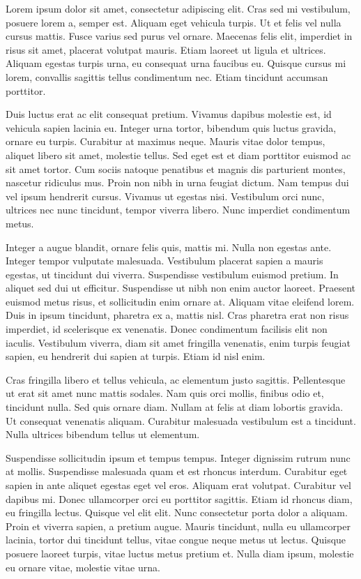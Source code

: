 \documentclass[11pt]{hmcpset}
\begin{document}
\begin{problem}
Lorem ipsum dolor sit amet, consectetur adipiscing elit. Cras sed mi vestibulum, posuere lorem a, semper est. Aliquam eget vehicula turpis. Ut et felis vel nulla cursus mattis. Fusce varius sed purus vel ornare. Maecenas felis elit, imperdiet in risus sit amet, placerat volutpat mauris. Etiam laoreet ut ligula et ultrices. Aliquam egestas turpis urna, eu consequat urna faucibus eu. Quisque cursus mi lorem, convallis sagittis tellus condimentum nec. Etiam tincidunt accumsan porttitor.

Duis luctus erat ac elit consequat pretium. Vivamus dapibus molestie est, id vehicula sapien lacinia eu. Integer urna tortor, bibendum quis luctus gravida, ornare eu turpis. Curabitur at maximus neque. Mauris vitae dolor tempus, aliquet libero sit amet, molestie tellus. Sed eget est et diam porttitor euismod ac sit amet tortor. Cum sociis natoque penatibus et magnis dis parturient montes, nascetur ridiculus mus. Proin non nibh in urna feugiat dictum. Nam tempus dui vel ipsum hendrerit cursus. Vivamus ut egestas nisi. Vestibulum orci nunc, ultrices nec nunc tincidunt, tempor viverra libero. Nunc imperdiet condimentum metus.
\end{problem}
\begin{solution}
	Integer a augue blandit, ornare felis quis, mattis mi. Nulla non egestas ante. Integer tempor vulputate malesuada. Vestibulum placerat sapien a mauris egestas, ut tincidunt dui viverra. Suspendisse vestibulum euismod pretium. In aliquet sed dui ut efficitur. Suspendisse ut nibh non enim auctor laoreet. Praesent euismod metus risus, et sollicitudin enim ornare at. Aliquam vitae eleifend lorem. Duis in ipsum tincidunt, pharetra ex a, mattis nisl. Cras pharetra erat non risus imperdiet, id scelerisque ex venenatis. Donec condimentum facilisis elit non iaculis. Vestibulum viverra, diam sit amet fringilla venenatis, enim turpis feugiat sapien, eu hendrerit dui sapien at turpis. Etiam id nisl enim.

Cras fringilla libero et tellus vehicula, ac elementum justo sagittis. Pellentesque ut erat sit amet nunc mattis sodales. Nam quis orci mollis, finibus odio et, tincidunt nulla. Sed quis ornare diam. Nullam at felis at diam lobortis gravida. Ut consequat venenatis aliquam. Curabitur malesuada vestibulum est a tincidunt. Nulla ultrices bibendum tellus ut elementum.

Suspendisse sollicitudin ipsum et tempus tempus. Integer dignissim rutrum nunc at mollis. Suspendisse malesuada quam et est rhoncus interdum. Curabitur eget sapien in ante aliquet egestas eget vel eros. Aliquam erat volutpat. Curabitur vel dapibus mi. Donec ullamcorper orci eu porttitor sagittis. Etiam id rhoncus diam, eu fringilla lectus. Quisque vel elit elit. Nunc consectetur porta dolor a aliquam. Proin et viverra sapien, a pretium augue. Mauris tincidunt, nulla eu ullamcorper lacinia, tortor dui tincidunt tellus, vitae congue neque metus ut lectus. Quisque posuere laoreet turpis, vitae luctus metus pretium et. Nulla diam ipsum, molestie eu ornare vitae, molestie vitae urna.
\end{solution}
\end{document}
